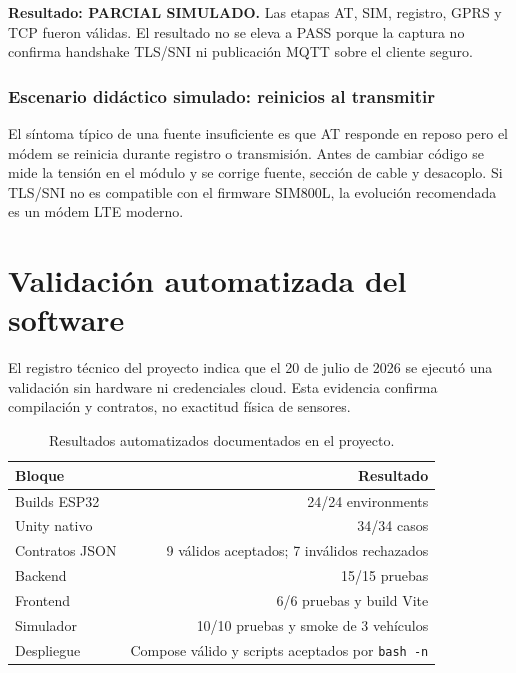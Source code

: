 \documentclass[11pt,a4paper,oneside]{report}
\begin{document}

\begin{vssimtest}
\textbf{Resultado: PARCIAL SIMULADO.} Las etapas AT, SIM, registro, GPRS y TCP fueron
válidas. El resultado no se eleva a PASS porque la captura no confirma handshake
TLS/SNI ni publicación MQTT sobre el cliente seguro.
\end{vssimtest}

\subsection*{Escenario didáctico simulado: reinicios al transmitir}
El síntoma típico de una fuente insuficiente es que AT responde en reposo pero el módem
se reinicia durante registro o transmisión. Antes de cambiar código se mide la tensión
en el módulo y se corrige fuente, sección de cable y desacoplo. Si TLS/SNI no es
compatible con el firmware SIM800L, la evolución recomendada es un módem LTE moderno.

\chapter{Validación automatizada del software}

El registro técnico del proyecto indica que el 20 de julio de 2026 se ejecutó una
validación sin hardware ni credenciales cloud. Esta evidencia confirma compilación y
contratos, no exactitud física de sensores.

\begin{table}[H]\centering
\caption{Resultados automatizados documentados en el proyecto.}
\begin{tabularx}{\textwidth}{@{}Y r@{}}
\toprule
\textbf{Bloque} & \textbf{Resultado}\\
\midrule
Builds ESP32 & 24/24 environments\\
Unity nativo & 34/34 casos\\
Contratos JSON & 9 válidos aceptados; 7 inválidos rechazados\\
Backend & 15/15 pruebas\\
Frontend & 6/6 pruebas y build Vite\\
Simulador & 10/10 pruebas y smoke de 3 vehículos\\
Despliegue & Compose válido y scripts aceptados por \texttt{bash -n}\\
\bottomrule
\end{tabularx}
\end{table}
\end{document}
